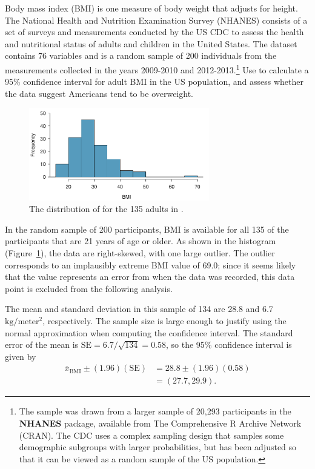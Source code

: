 \begin{example}{Body mass index (BMI) is one measure of body weight that adjusts for height. The National Health and Nutrition Examination Survey (NHANES) consists of a set of surveys and measurements conducted by the US CDC to assess the health and nutritional status of adults and children in the United States. The dataset  contains 76 variables and is a random sample of 200 individuals from the measurements collected in the years 2009-2010 and 2012-2013.\footnote{The sample was drawn from a larger sample of 20,293 participants in the \textbf{NHANES} package, available from The Comprehensive R Archive Network (CRAN). The CDC uses a complex sampling design that samples some demographic subgroups with larger probabilities, but  has been adjusted so that it can be viewed as a random sample of the US population.} Use  to calculate a 95\% confidence interval for adult BMI in the US population, and assess whether the data suggest Americans tend to be overweight. \label{exNhanesBmi}}
	
\begin{figure}[h]
		\centering
		\includegraphics[width=0.7\textwidth]{ch_inference_foundations_oi_biostat/figures/nhanesAdultBmiHist/nhanesAdultBmiHist.pdf}
		\caption{The distribution of  for the 135 adults in .}
		\label{nhanesAdultBmiHist}
\end{figure}
	
	In the random sample of 200 participants, BMI is available for all 135 of the participants that are 21 years of age or older. As shown in the histogram (Figure~\ref{nhanesAdultBmiHist}), the data are right-skewed, with one large outlier. The outlier corresponds to an implausibly extreme BMI value of 69.0; since it seems likely that the value represents an error from when the data was recorded, this data point is excluded from the following analysis. 
	
	The mean and standard deviation in this sample of 134 are 28.8 and 6.7 $\text{kg}/\text{meter}{^2}$, respectively.  The sample size is large enough to justify using the normal approximation when computing the confidence interval.  The standard error of the mean is $\text{SE} = 6.7/\sqrt{134} = 0.58$, so the 95\% confidence interval is given by 
	\begin{align*}
	\overline{x}_{\text{BMI}} \pm (1.96)(\text{SE}) &= 28.8 \pm (1.96)(0.58) \\
	&= (27.7, 29.9).
	\end{align*}	
	

\end{example}
